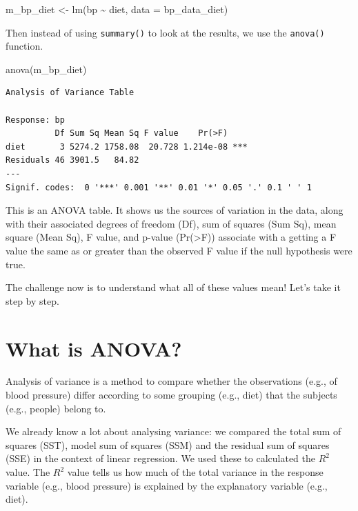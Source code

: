 \documentclass[
  letterpaper,
  8pt,
  a4paper]{book}
\newenvironment{Shaded}{\begin{snugshade}}{\end{snugshade}}
\newcommand{\AttributeTok}[1]{\textcolor[rgb]{0.40,0.45,0.13}{#1}}
\newcommand{\FunctionTok}[1]{\textcolor[rgb]{0.28,0.35,0.67}{#1}}
\newcommand{\NormalTok}[1]{\textcolor[rgb]{0.00,0.23,0.31}{#1}}
\newcommand{\OtherTok}[1]{\textcolor[rgb]{0.00,0.23,0.31}{#1}}
\newcommand{\SpecialCharTok}[1]{\textcolor[rgb]{0.37,0.37,0.37}{#1}}
\begin{document}
\begin{Shaded}
\begin{Highlighting}[]
\NormalTok{m\_bp\_diet }\OtherTok{\textless{}{-}} \FunctionTok{lm}\NormalTok{(bp }\SpecialCharTok{\textasciitilde{}}\NormalTok{ diet, }\AttributeTok{data =}\NormalTok{ bp\_data\_diet)}
\end{Highlighting}
\end{Shaded}

Then instead of using \texttt{summary()} to look at the results, we use
the \texttt{anova()} function.

\begin{Shaded}
\begin{Highlighting}[]
\FunctionTok{anova}\NormalTok{(m\_bp\_diet)}
\end{Highlighting}
\end{Shaded}

\begin{verbatim}
Analysis of Variance Table

Response: bp
          Df Sum Sq Mean Sq F value    Pr(>F)    
diet       3 5274.2 1758.08  20.728 1.214e-08 ***
Residuals 46 3901.5   84.82                      
---
Signif. codes:  0 '***' 0.001 '**' 0.01 '*' 0.05 '.' 0.1 ' ' 1
\end{verbatim}

This is an ANOVA table. It shows us the sources of variation in the
data, along with their associated degrees of freedom (Df), sum of
squares (Sum Sq), mean square (Mean Sq), F value, and p-value
(Pr(\textgreater F)) associate with a getting a F value the same as or
greater than the observed F value if the null hypothesis were true.

The challenge now is to understand what all of these values mean! Let's
take it step by step.

\section*{What is ANOVA?}\label{what-is-anova}


Analysis of variance is a method to compare whether the observations
(e.g., of blood pressure) differ according to some grouping (e.g., diet)
that the subjects (e.g., people) belong to.

We already know a lot about analysing variance: we compared the total
sum of squares (SST), model sum of squares (SSM) and the residual sum of
squares (SSE) in the context of linear regression. We used these to
calculated the \(R^2\) value. The \(R^2\) value tells us how much of the
total variance in the response variable (e.g., blood pressure) is
explained by the explanatory variable (e.g., diet).
\end{document}
